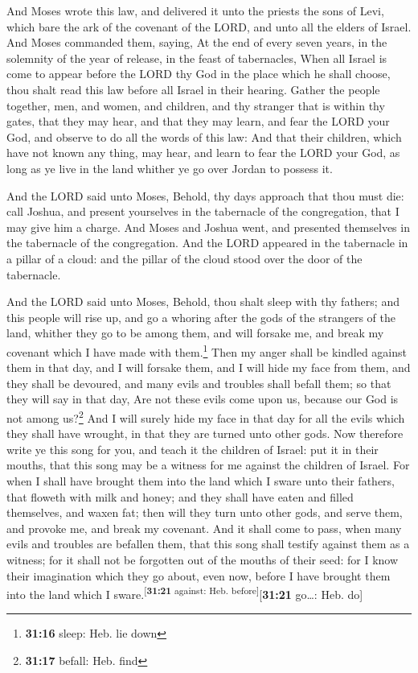  And Moses wrote this law, and delivered it unto the
priests the sons of Levi, which bare the ark of the covenant of the
LORD, and unto all the elders of Israel.  And Moses
commanded them, saying, At the end of every seven years, in the
solemnity of the year of release, in the feast of tabernacles,
 When all Israel is come to appear before the LORD thy
God in the place which he shall choose, thou shalt read this law before
all Israel in their hearing.  Gather the people together,
men, and women, and children, and thy stranger that is within thy gates,
that they may hear, and that they may learn, and fear the LORD your God,
and observe to do all the words of this law:  And that
their children, which have not known any thing, may hear, and learn to
fear the LORD your God, as long as ye live in the land whither ye go
over Jordan to possess it.

 And the LORD said unto Moses, Behold, thy days approach
that thou must die: call Joshua, and present yourselves in the
tabernacle of the congregation, that I may give him a charge. And Moses
and Joshua went, and presented themselves in the tabernacle of the
congregation.  And the LORD appeared in the tabernacle in
a pillar of a cloud: and the pillar of the cloud stood over the door of
the tabernacle.

 And the LORD said unto Moses, Behold, thou shalt sleep
with thy fathers; and this people will rise up, and go a whoring after
the gods of the strangers of the land, whither they go to be among them,
and will forsake me, and break my covenant which I have made with
them.\footnote{\textbf{31:16} sleep: Heb. lie down}  Then
my anger shall be kindled against them in that day, and I will forsake
them, and I will hide my face from them, and they shall be devoured, and
many evils and troubles shall befall them; so that they will say in that
day, Are not these evils come upon us, because our God is not among
us?\footnote{\textbf{31:17} befall: Heb. find}  And I
will surely hide my face in that day for all the evils which they shall
have wrought, in that they are turned unto other gods. 
Now therefore write ye this song for you, and teach it the children of
Israel: put it in their mouths, that this song may be a witness for me
against the children of Israel.  For when I shall have
brought them into the land which I sware unto their fathers, that
floweth with milk and honey; and they shall have eaten and filled
themselves, and waxen fat; then will they turn unto other gods, and
serve them, and provoke me, and break my covenant.  And
it shall come to pass, when many evils and troubles are befallen them,
that this song shall testify against them as a witness; for it shall not
be forgotten out of the mouths of their seed: for I know their
imagination which they go about, even now, before I have brought them
into the land which I sware.\textsuperscript{{[}\textbf{31:21} against:
Heb. before{]}}{[}\textbf{31:21} go\ldots: Heb. do{]}

